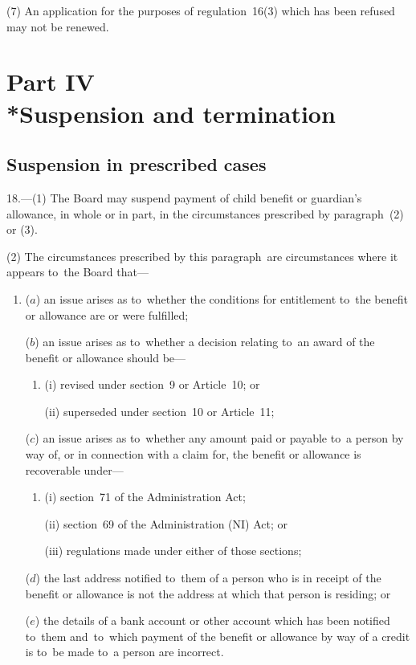 \documentclass[12pt,a4paper]{article}
\begin{document}
(7) An application for the purposes of regulation~16(3) which has been refused may not be renewed.

\section[Part IV --- Suspension and termination]{Part IV\\*Suspension and termination}

\renewcommand\parthead{--- Part IV}

\subsection[18. Suspension in prescribed cases]{Suspension in prescribed cases}

18.---(1)  The Board may suspend payment of child benefit or guardian’s allowance, in whole or in part, in the circumstances prescribed by paragraph~(2) or (3).

(2) The circumstances prescribed by this paragraph~are circumstances where it appears to~the Board that—
\begin{enumerate}\item[]
($a$) an issue arises as to~whether the conditions for entitlement to~the benefit or allowance are or were fulfilled;

($b$) an issue arises as to~whether a decision relating to~an award of the benefit or allowance should be—
\begin{enumerate}\item[]
(i) revised under section~9 or Article~10; or

(ii) superseded under section~10 or Article~11;
\end{enumerate}

($c$) an issue arises as to~whether any amount paid or payable to~a person by way of, or in connection with a claim for, the benefit or allowance is recoverable under—
\begin{enumerate}\item[]
(i) section~71 of the Administration Act;

(ii) section~69 of the Administration (NI) Act; or

(iii) regulations made under either of those sections;
\end{enumerate}

($d$) the last address notified to~them of a person who is in receipt of the benefit or allowance is not the address at which that person is residing; or

($e$) the details of a bank account or other account which has been notified to~them and~to~which payment of the benefit or allowance by way of a credit is to~be made to~a person are incorrect.
\end{enumerate}
\end{document}
